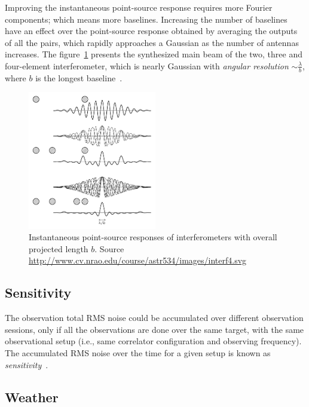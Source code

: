 Improving the instantaneous point-source response requires more Fourier components; which means more baselines. Increasing the number of baselines have an effect over the point-source response obtained by averaging the outputs of all the pairs, which rapidly approaches a Gaussian as the number of antennas increases. The figure~\ref{fig:interf-components} presents the synthesized main beam of the two, three and four-element interferometer, which is nearly Gaussian with \textit{angular resolution} $\sim \frac{\lambda}{b}$, where $b$ is the longest baseline~\cite{condon10}.  
\begin{figure}[htbp]
\centering
\includegraphics[width=0.5\textwidth]{images/interf4}
\caption[Instantaneous point-source responses of interferometers with overall projected length $b$]{Instantaneous point-source responses of interferometers with overall projected length $b$. Source \url{http://www.cv.nrao.edu/course/astr534/images/interf4.svg}}
\label{fig:interf-components}
\end{figure}

\subsection{Sensitivity}
\label{sec:sens}
The observation total RMS noise could be accumulated over different observation sessions, only if all the observations are done over the same target, with the same observational setup (i.e., same correlator configuration and observing frequency). The accumulated RMS noise over the time for a given setup is known as \textit{sensitivity}~\cite{avarias11}.

\subsection{Weather}

